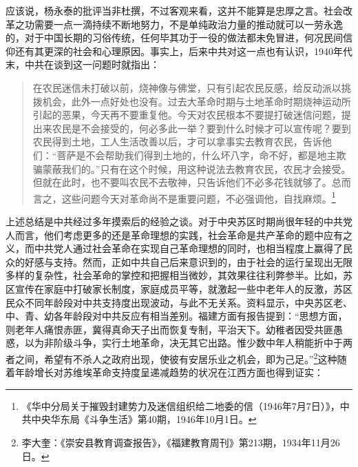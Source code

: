 应该说，杨永泰的批评当非杜撰，不过客观来看，这并不能算是忠厚之言。社会改革之功需要一点一滴持续不断地努力，不是单纯政治力量的推动就可以一劳永逸的，对于中国长期的习俗传统，任何毕其功于一役的做法都未免冒进，何况民间信仰还有其更深的社会和心理原因。事实上，后来中共对这一点也有认识，1940年代末，中共在谈到这一问题时就指出：

\begin{quote}

在农民迷信未打破以前，烧神像与佛堂，只有引起农民反感，给反动派以挑拨机会，此外一点好处也没有。过去大革命时期与土地革命时期烧神运动所引起的恶果，今天再不要重复他。今天对农民根本不要提打破迷信问题，提出来农民是不会接受的，何必多此一举？要到什么时候才可以宣传呢？要到农民得到土地，工人生活改善以后，才可以拿事实去教育农民，告诉他们：“菩萨是不会帮助我们得到土地的，什么坏八字，命不好，都是地主欺骗蒙蔽我们的。”只有在这个时候，用这种说法去教育农民，农民才会接受。但就在此时，也不要叫农民不去敬神，只告诉他们不必多花钱就够了。总而言之，这些问题今天对革命尚不是重要问题，不必强调他，自找麻烦。\footnote{《华中分局关于摧毁封建势力及迷信组织给二地委的信（1946年7月7日）》，中共中央华东局《斗争生活》第40期，1946年10月1日。}
\end{quote}


上述总结是中共经过多年摸索后的经验之谈。对于中央苏区时期尚很年轻的中共党人而言，他们考虑更多的还是革命理想的实践，社会革命是共产革命的题中应有之义，而中共党人通过社会革命在实现自己革命理想的同时，也相当程度上赢得了民众的好感与支持。然而，正如中共自己后来意识到的，由于社会的运行呈现出无限多样的复杂性，社会革命的掌控和把握相当微妙，其效果往往利弊参半。比如，苏区宣传在家庭中打破家长制度，家庭成员平等，就激起一些中老年人的反激，苏区民众不同年龄段对中共支持度出现波动，与此不无关系。资料显示，中央苏区老、中、青、幼各年龄段对中共反应有相当差别。福建方面有报告提到：“思想方面，则老年人痛恨赤匪，冀得真命天子出而恢复专制，平治天下。幼稚者因受共匪愚惑，以为非阶级斗争，实行土地革命，决无其它出路。惟少数中年人稍能折中于两者之间，希望有不杀人之政府出现，使彼有安居乐业之机会，即为己足。”\footnote{李大奎：《崇安县教育调查报告》，《福建教育周刊》第213期，1934年11月26日。}这种随着年龄增长对苏维埃革命支持度呈递减趋势的状况在江西方面也得到证实：


